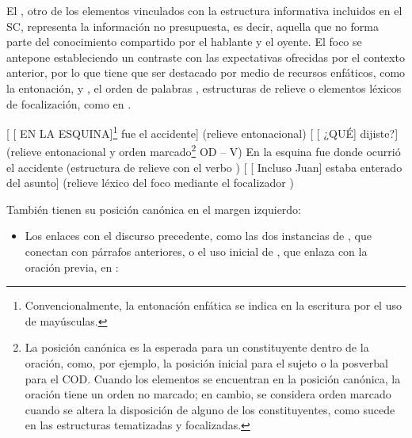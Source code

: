 \begin{recuadro}
El , otro de los elementos vinculados con la estructura
informativa incluidos en el SC, representa la información no presupuesta, es
decir, aquella que no forma parte del conocimiento compartido por el hablante y
el oyente. El foco se antepone estableciendo un contraste con las expectativas
ofrecidas por el contexto anterior, por lo que tiene que ser destacado por medio
de recursos enfáticos, como la entonación,  y
, el orden de palabras , estructuras de
relieve  o elementos léxicos de focalización, como
 en .

\begin{exe}
  \ex\label{ex:06-foc1} {}[ [ EN LA ESQUINA]\footnote{Convencionalmente,
      la entonación enfática se indica en la escritura por el uso de
      mayúsculas.} fue el accidente] (relieve entonacional)
  \ex\label{ex:06-foc2} {}[ [ ¿QUÉ] dijiste?] (relieve
      entonacional y orden marcado\footnote{La posición canónica es la esperada
      para un constituyente dentro de la oración, como, por ejemplo, la
      posición inicial para el sujeto o la posverbal para el COD. Cuando los
      elementos se encuentran en la posición canónica, la oración tiene un
      orden no marcado; en cambio, se considera orden marcado cuando se altera
      la disposición de alguno de los constituyentes, como sucede en las
      estructuras tematizadas y focalizadas.} OD -- V)
  \ex\label{ex:06-foc3} En la esquina fue donde ocurrió el accidente
      (estructura de relieve con el verbo )
  \ex\label{ex:06-foc4} {}[ [ Incluso Juan] estaba enterado del
      asunto] (relieve léxico del foco  mediante el focalizador
      )
\end{exe}

También tienen su posición canónica en el margen izquierdo:

\begin{itemize}
  \item Los enlaces con el discurso precedente, como las dos instancias de
        , que conectan con párrafos anteriores, o el uso inicial de
        , que enlaza con la oración previa, en :
\end{itemize}

\begin{exe}
  \ex\label{ex:06-asimov}
\end{exe}


\end{recuadro}
